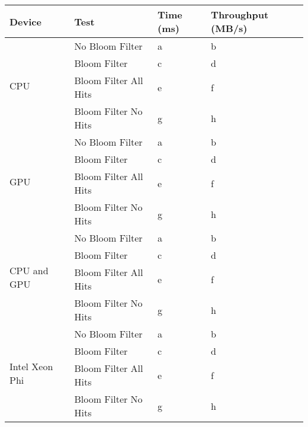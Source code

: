\begin{tabular}{|l|l|l|l|}
\hline
Device & Test & Time (ms) & Throughput (MB/s)\\
\hline
\multirow{4}{*}{CPU}
& No Bloom Filter & a & b \\
& Bloom Filter & c & d \\
& Bloom Filter All Hits & e & f \\
& Bloom Filter No Hits & g & h \\
\hline
\multirow{4}{*}{GPU}
& No Bloom Filter & a & b \\
& Bloom Filter & c & d \\
& Bloom Filter All Hits & e & f \\
& Bloom Filter No Hits & g & h \\
\hline
\multirow{4}{*}{CPU and GPU}
& No Bloom Filter & a & b \\
& Bloom Filter & c & d \\
& Bloom Filter All Hits & e & f \\
& Bloom Filter No Hits & g & h \\
\hline
\multirow{4}{*}{Intel Xeon Phi}
& No Bloom Filter & a & b \\
& Bloom Filter & c & d \\
& Bloom Filter All Hits & e & f \\
& Bloom Filter No Hits & g & h \\
\hline
\end{tabular}
